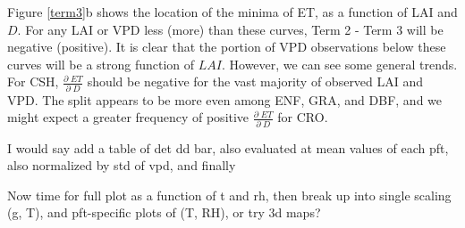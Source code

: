 \documentclass[draft,linenumbers]{agujournal}
\begin{document}
Figure \ref{term3}b shows the location of the minima of ET, as a function of LAI and $D$. For any LAI or VPD less (more) than these curves, Term 2 - Term 3 will be negative (positive). It is clear that the portion of VPD observations below these curves will be a strong function of $LAI$. However, we can see some general trends. For CSH, $\frac{\partial \; ET}{\partial \; D}$ should be negative for the vast majority of observed LAI and VPD. The split appears to be more even among ENF, GRA, and DBF, and we might expect a greater frequency of positive $\frac{\partial \; ET}{\partial \; D}$ for CRO. 

I would say add a table of det dd bar, also evaluated at mean values of each pft, also normalized by std of vpd, and finally 

Now time for full plot as a function of t and rh, then break up into single scaling (g, T), and pft-specific plots of (T, RH), or try 3d maps?




 \begin{linenomath*}
 \begin{equation}
 \end{equation}
 \end{linenomath*}


%
%
%
%
%
%
%
%
\end{document}
